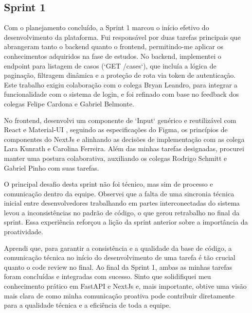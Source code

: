 \subsection{Sprint 1}

Com o planejamento concluído, a Sprint 1 marcou o início efetivo do desenvolvimento da plataforma. Fui responsável por duas tarefas principais que abrangeram tanto o backend quanto o frontend, permitindo-me aplicar os conhecimentos adquiridos na fase de estudos. No backend, implementei o endpoint para listagem de casos (`GET /cases`), que incluía a lógica de paginação, filtragem dinâmica e a proteção de rota via token de autenticação. Este trabalho exigiu colaboração com o colega Bryan Leandro, para integrar a funcionalidade com o sistema de login, e foi refinado com base no feedback dos colegas Felipe Cardona e Gabriel Belmonte.

No frontend, desenvolvi um componente de `Input` genérico e reutilizável com React e Material-UI \cite{materialui}, seguindo as especificações do Figma, os princípios de componentes do NextJs e alinhando as decisões de implementação com as colega Lara Kunrath e Carolina Ferreira. Além das minhas tarefas designadas, procurei manter uma postura colaborativa, auxiliando os colegas Rodrigo Schmitt e Gabriel Pinho com suas tarefas.

O principal desafio desta sprint não foi técnico, mas sim de processo e comunicação dentro da equipe. Observei que a falta de uma sincronia técnica inicial entre desenvolvedores trabalhando em partes interconectadas do sistema levou a inconsistências no padrão de código, o que gerou retrabalho no final da sprint. Essa experiência reforçou a lição da sprint anterior sobre a importância da proatividade.

Aprendi que, para garantir a consistência e a qualidade da base de código, a comunicação técnica no início do desenvolvimento de uma tarefa é tão crucial quanto o code review no final. Ao final da Sprint 1, ambas as minhas tarefas foram concluídas e integradas com sucesso. Sinto que solidifiquei meu conhecimento prático em FastAPI e NextJs e, mais importante, obtive uma visão mais clara de como minha comunicação proativa pode contribuir diretamente para a qualidade técnica e a eficiência de toda a equipe.